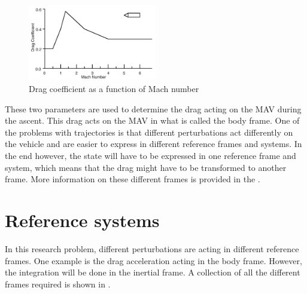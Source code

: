\begin{figure}[H]
\centering
\includegraphics[width=0.5\textwidth]{figures/launcher_methods/dragcoeff_whitehead2004mars.jpg}
\caption{Drag coefficient as a function of Mach number \cite{whitehead2004mars}}
\label{fig:dragcoeff_whitehead2004mars}
\end{figure}

These two parameters are used to determine the drag acting on the \ac{MAV} during the ascent. This drag acts on the \ac{MAV} in what is called the body frame. One of the problems with trajectories is that different perturbations act differently on the vehicle and are easier to express in different reference frames and systems. In the end however, the state will have to be expressed in one reference frame and system, which means that the drag might have to be transformed to another frame. More information on these different frames is provided in the .




\section{Reference systems}
\label{sec:referenceSystems}
In this research problem, different perturbations are acting in different reference frames. One example is the drag acceleration acting in the body frame. However, the integration will be done in the inertial frame. A collection of all the different frames required is shown in .



